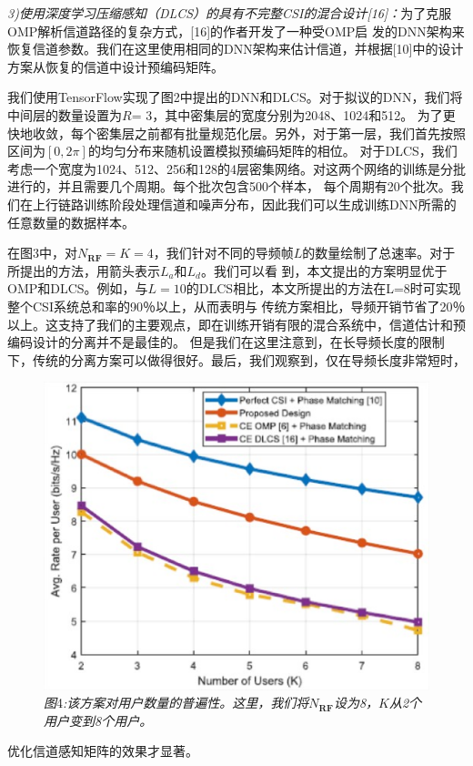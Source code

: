 \documentclass[10pt,journal,final]{IEEEtran}%
\begin{document}
\textit{3)使用深度学习压缩感知（DLCS）的具有不完整CSI的混合设计[16]：}为了克服OMP解析信道路径的复杂方式，[16]的作者开发了一种受OMP启
发的DNN架构来恢复信道参数。我们在这里使用相同的DNN架构来估计信道，并根据[10]中的设计方案从恢复的信道中设计预编码矩阵。

我们使用TensorFlow实现了图2中提出的DNN和DLCS。对于拟议的DNN，我们将中间层的数量设置为$R$= 3，其中密集层的宽度分别为2048、1024和512。
为了更快地收敛，每个密集层之前都有批量规范化层。另外，对于第一层，我们首先按照区间为$[0,2\pi]$的均匀分布来随机设置模拟预编码矩阵的相位。
对于DLCS，我们考虑一个宽度为1024、512、256和128的4层密集网络。对这两个网络的训练是分批进行的，并且需要几个周期。每个批次包含500个样本，
每个周期有20个批次。我们在上行链路训练阶段处理信道和噪声分布，因此我们可以生成训练DNN所需的任意数量的数据样本。

在图3中，对$N_{\mathbf{RF}}=K=4$，我们针对不同的导频帧$L$的数量绘制了总速率。对于所提出的方法，用箭头表示$L_{a}$和$L_{d}$。我们可以看
到，本文提出的方案明显优于OMP和DLCS。例如，与$L = 10$的DLCS相比，本文所提出的方法在L=8时可实现整个CSI系统总和率的90％以上，从而表明与
传统方案相比，导频开销节省了20％以上。这支持了我们的主要观点，即在训练开销有限的混合系统中，信道估计和预编码设计的分离并不是最佳的。
但是我们在这里注意到，在长导频长度的限制下，传统的分离方案可以做得很好。最后，我们观察到，仅在导频长度非常短时，
\begin{figure}[H]
    \centering
    \includegraphics[scale=0.5]{4.eps}
    \caption*{\textit{\small{图}}\small{4}\textit{\small{:该方案对用户数量的普遍性。这里，我们将$N_{\mathbf{RF}}$设为8，$K$从2个用户变到8个用户。}}}
\end{figure}
\vspace{-0.9em}
\noindent 优化信道感知矩阵的效果才显著。
\end{document}

